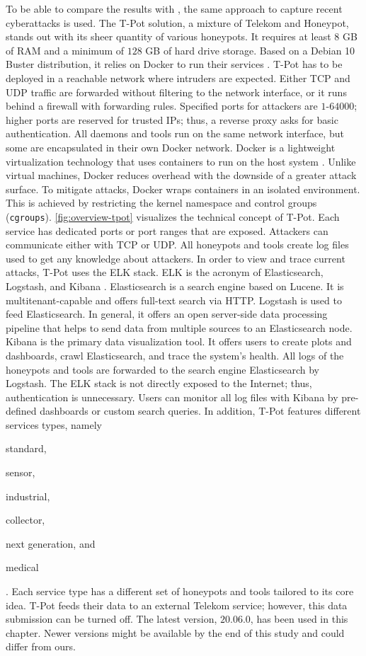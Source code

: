 To be able to compare the results with \citet{Kelly2021}, the same approach to capture recent cyberattacks is used.
The T-Pot solution, a mixture of Telekom and Honeypot, stands out with its sheer quantity of various honeypots.
It requires at least $8$ GB of RAM and a minimum of $128$ GB of hard drive storage.
Based on a Debian 10 Buster distribution, it relies on Docker to run their services \cite{docker2021}.
T-Pot has to be deployed in a reachable network where intruders are expected.
Either TCP and UDP traffic are forwarded without filtering to the network interface, or it runs behind a firewall with forwarding rules.
Specified ports for attackers are $1$-$64000$; higher ports are reserved for trusted IPs; thus, a reverse proxy asks for basic authentication.
All daemons and tools run on the same network interface, but some are encapsulated in their own Docker network.
Docker is a lightweight virtualization technology that uses containers to run on the host system \cite{combe2016}.
Unlike virtual machines, Docker reduces overhead with the downside of a greater attack surface.
To mitigate attacks, Docker wraps containers in an isolated environment.
This is achieved by restricting the kernel namespace and control groups (\verb|cgroups|).
\autoref{fig:overview-tpot} visualizes the technical concept of T-Pot.
Each service has dedicated ports or port ranges that are exposed.
Attackers can communicate either with TCP or UDP.
All honeypots and tools create log files used to get any knowledge about attackers.
In order to view and trace current attacks, T-Pot uses the ELK stack.
ELK is the acronym of Elasticsearch, Logstash, and Kibana \cite{elastic2021}.
Elasticsearch is a search engine based on Lucene.
It is multitenant-capable and offers full-text search via HTTP.
Logstash is used to feed Elasticsearch.
In general, it offers an open server-side data processing pipeline that helps to send data from multiple sources to an Elasticsearch node.
Kibana is the primary data visualization tool.
It offers users to create plots and dashboards, crawl Elasticsearch, and trace the system's health.
All logs of the honeypots and tools are forwarded to the search engine Elasticsearch by Logstash.
The ELK stack is not directly exposed to the Internet; thus, authentication is unnecessary.
Users can monitor all log files with Kibana by pre-defined dashboards or custom search queries.
In addition, T-Pot features different services types, namely
\begin{enumerate*}[label=(\roman*)]
    \item standard,
    \item sensor,
    \item industrial,
    \item collector,
    \item next generation, and
    \item medical
\end{enumerate*}.
Each service type has a different set of honeypots and tools tailored to its core idea.
T-Pot feeds their data to an external Telekom service; however, this data submission can be turned off.
The latest version, $20.06.0$, has been used in this chapter.
Newer versions might be available by the end of this study and could differ from ours.

